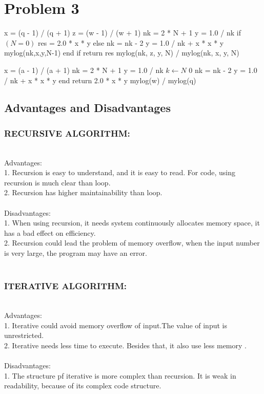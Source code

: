 \documentclass[12pt,letterpaper]{article}
\begin{document}
\section*{Problem 3}
\newline
\begin{codebox}
	\li x = (q - 1) / (q + 1)
	\li z = (w - 1) / (w + 1)
	\li nk = 2 * N + 1
	\li y = 1.0 / nk
	\li if $(N = 0)$ 
	\li \quad res = 2.0 * x * y  
	\li else
	\li \quad nk = nk - 2
	\li \quad y = 1.0 / nk + x * x * y
	\li \quad mylog(nk,x,y,N-1)
	\li end if
	\li return res
	\li mylog(nk, z, y, N) / mylog(nk, x, y, N)
	\End
\end{codebox}

\begin{codebox}
	\li x = (a - 1) / (a + 1)
	\li nk = 2 * N + 1
	\li y = 1.0 / nk
	\li \For $k \gets N$ \To $0$
	\li	\quad nk = nk - 2
	\li \quad y = 1.0 / nk + x * x * y
	\li end \For
	\li return 2.0 * x * y
	\li mylog(w) / mylog(q)
	\End
\end{codebox}

\subsection*{Advantages and Disadvantages}
\subsubsection*{RECURSIVE ALGORITHM:}\\
Advantages:\\
1. Recursion is easy to understand, and it is easy to read. For code, using recursion is much clear than loop.\\
2. Recursion has higher maintainability than loop.\\
\\
Disadvantages:\\
1. When using recursion, it needs system continuously allocates memory space, it has a bad effect on efficiency. \\
2. Recursion could lead the problem of memory overflow, when the input number is very large, the program may have an error.
\\
\\
\subsubsection*{ITERATIVE ALGORITHM:}\\
Advantages:\\
1. Iterative could avoid memory overflow of input.The value of input is unrestricted.\\
2. Iterative needs less time to execute. Besides that, it also use less memory .\\
\\
Disadvantages:\\
1. The structure pf iterative is more complex than recursion. It is weak in readability, because of its complex code structure.
\end{document}

